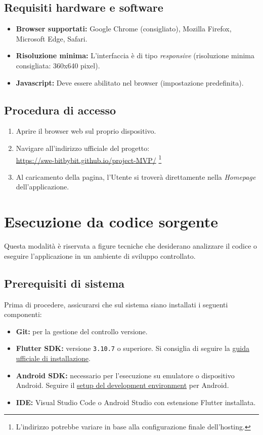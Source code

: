 \documentclass[a4paper,12pt]{article}
\begin{document}
\subsection{Requisiti hardware e software}
\begin{itemize}
    \item \textbf{Browser supportati:} Google Chrome (consigliato), Mozilla Firefox, Microsoft Edge, Safari.
    \item \textbf{Risoluzione minima:} L'interfaccia è di tipo \textit{responsive} (risoluzione minima consigliata: 360x640 pixel).
    \item \textbf{Javascript:} Deve essere abilitato nel browser (impostazione predefinita).
\end{itemize}

\subsection{Procedura di accesso}
\begin{enumerate}
    \item Aprire il browser web sul proprio dispositivo.
    \item Navigare all'indirizzo ufficiale del progetto: \\ 
    \url{https://swe-bitbybit.github.io/project-MVP/} \footnote{L'indirizzo potrebbe variare in base alla configurazione finale dell'hosting.}
    \item Al caricamento della pagina, l'Utente si troverà direttamente nella \textit{Homepage} dell'applicazione.
\end{enumerate}

\section{Esecuzione da codice sorgente} \label{sec:esecuzione_sorgenti}

Questa modalità è riservata a figure tecniche che desiderano analizzare il codice o eseguire l'applicazione in un ambiente di sviluppo controllato.

\subsection{Prerequisiti di sistema} \label{subsec:prerequisiti_sorgente}
Prima di procedere, assicurarsi che sul sistema siano installati i seguenti componenti:
\begin{itemize}
    \item \textbf{Git:} per la gestione del controllo versione.
    \item \textbf{Flutter SDK:} versione \texttt{3.10.7} o superiore. Si consiglia di seguire la \href{https://docs.flutter.dev/install/quick}{guida ufficiale di installazione}.
    \item \textbf{Android SDK:} necessario per l'esecuzione su emulatore o dispositivo Android. Seguire il \href{https://docs.flutter.dev/platform-integration/android/setup}{setup del development environment} per Android.
    \item \textbf{IDE:} Visual Studio Code o Android Studio con estensione Flutter installata.
\end{itemize}
\end{document}
